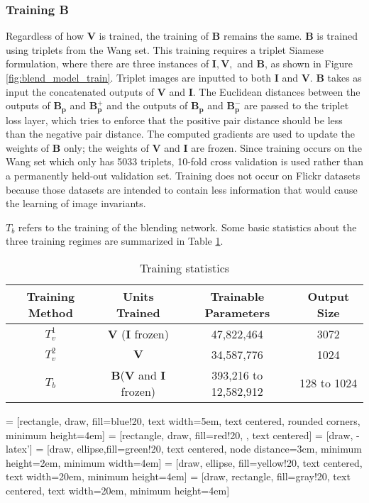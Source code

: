 \subsubsection{Training B}
Regardless of how $\mathbf{V}$ is trained, the training of $\mathbf{B}$ remains the same. $\mathbf{B}$ is trained using triplets from the Wang set. This training requires a triplet Siamese formulation, where there are three instances of $\mathbf{I}, \mathbf{V},$ and $\mathbf{B}$, as shown in Figure \ref{fig:blend_model_train}. Triplet images are inputted to both $\mathbf{I}$ and $\mathbf{V}$. $\mathbf{B}$ takes as input the concatenated outputs of $\mathbf{V}$ and $\mathbf{I}$. The Euclidean distances between the outputs of $\mathbf{B_p}$ and $\mathbf{B_p^+}$ and the outputs of $\mathbf{B_p}$ and $\mathbf{B_p^-}$ are passed to the triplet loss layer, which tries to enforce that the positive pair distance should be less than the negative pair distance. The computed gradients are used to update the weights of $\mathbf{B}$ only; the weights of $\mathbf{V}$ and $\mathbf{I}$ are frozen. Since training occurs on the Wang set which only has 5033 triplets, 10-fold cross validation is used rather than a permanently held-out validation set. Training does not occur on Flickr datasets because those datasets are intended to contain less information that would cause the learning of image invariants.

$T_b$ refers to the training of the blending network. Some basic statistics about the three training regimes are summarized in Table \ref{table:embedding_parameters}.

\begin{table}
	\begin{tabular}{*{4}{c}}
		\toprule
		\bfseries Training Method & \bfseries Units Trained & \bfseries Trainable Parameters & \bfseries Output Size\\
		\midrule
		$T_v^1$ & $\mathbf{V}$ ($\mathbf{I}$ frozen) & 47,822,464 & 3072\\
		$T_v^2$ & $\mathbf{V}$ & 34,587,776 & 1024\\
		$T_b$ & $\mathbf{B}$($\mathbf{V}$ and $\mathbf{I}$ frozen) & 393,216 to 12,582,912 & 128 to 1024\\
		\bottomrule
	\end{tabular}
	\caption{Training statistics}
	\label{table:embedding_parameters}
\end{table}



 = [rectangle, draw, fill=blue!20, 
text width=5em, text centered, rounded corners, minimum height=4em]
 = [rectangle, draw, fill=red!20, , text centered]
 = [draw, -latex']
 = [draw, ellipse,fill=green!20, text centered, node distance=3cm,
minimum height=2em, minimum width=4em]
 = [draw, ellipse, fill=yellow!20, text centered,  text width=20em, minimum height=4em]
 = [draw, rectangle, fill=gray!20, text centered,  text width=20em, minimum height=4em]

